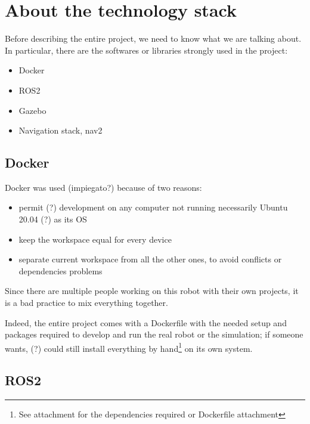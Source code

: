 \chapter{About the technology stack}
\label{cha:techstack}

Before describing the entire project, we need to know what we are talking about. In particular, there are the softwares or libraries strongly used in the project:  
\begin{itemize}
    \item Docker
    \item ROS2
    \item Gazebo
    \item Navigation stack, nav2
\end{itemize}

\section{Docker}

Docker was used (impiegato?) because of two reasons:
\begin{itemize}
    \item permit (?) development on any computer not running necessarily Ubuntu 20.04 (?) as its OS
    \item keep the workspace equal for every device
    \item separate current workspace from all the other ones, to avoid conflicts or dependencies problems
\end{itemize}  

Since there are multiple people working on this robot with their own projects, it is a bad practice to mix everything together. %

Indeed, the entire project comes with a Dockerfile with the needed setup and packages required to develop and run the real robot or the simulation; if someone wants, (?) could still install everything by hand\footnote{See attachment for the dependencies required or Dockerfile attachment} on its own system.


\section{ROS2}


